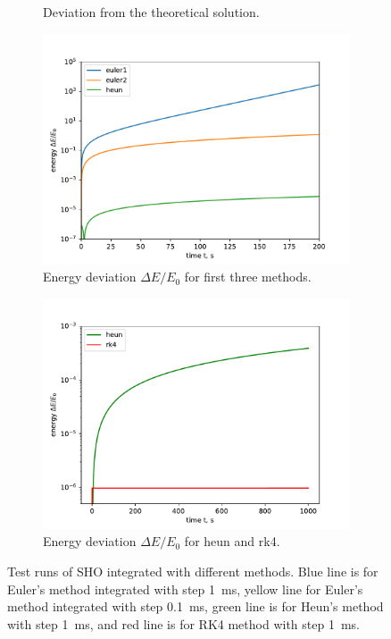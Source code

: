 \documentclass[]{article}
\begin{document}
\begin{figure}[!htb]
\begin{subfigure}[t]{0.48\textwidth}
			\caption{Deviation from the theoretical solution.\label{subfig:sho-dev}}
		\end{subfigure}
		\hfill

		\hfill
		\begin{subfigure}[t]{0.48\textwidth}
			\centering
			\includegraphics[width=\textwidth]{figures/eul12+heun+energy.pdf}
			\caption{Energy deviation $\Delta E/E_0$ for first three methods.\label{subfig:sho-energy1}}
		\end{subfigure}
		\hfill
		\begin{subfigure}[t]{0.48\textwidth}
			\centering
			\includegraphics[width=\textwidth]{figures/heunRK4+energy.pdf}
			\caption{Energy deviation $\Delta E/E_0$ for heun and rk4.\label{subfig:sho-energy2}}
		\end{subfigure}
		\hfill
		\caption{Test runs of SHO integrated with different methods. Blue line is for Euler's method integrated with step \SI{1}{ms}, yellow line for Euler's method integrated with step \SI{0.1}{ms}, green line is for Heun's method with step \SI{1}{ms}, and red line is for RK4 method with step \SI{1}{ms}.\label{fig:sho-integration}}
	\end{figure}
\end{document}
